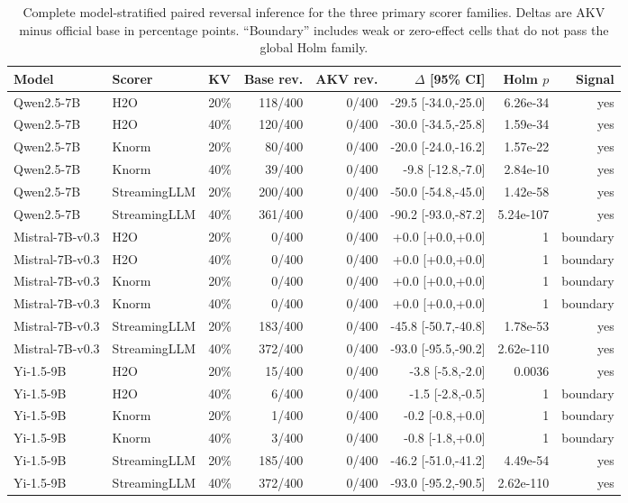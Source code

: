 \begin{table}[t]
\centering
\scriptsize
\setlength{\tabcolsep}{3.0pt}
\begin{tabular}{lllrrrrr}
\toprule
Model & Scorer & KV & Base rev. & AKV rev. & $\Delta$ [95\% CI] & Holm $p$ & Signal \\
\midrule
Qwen2.5-7B & H2O & 20\% & 118/400 & 0/400 & -29.5 [-34.0,-25.0] & 6.26e-34 & yes \\
Qwen2.5-7B & H2O & 40\% & 120/400 & 0/400 & -30.0 [-34.5,-25.8] & 1.59e-34 & yes \\
Qwen2.5-7B & Knorm & 20\% & 80/400 & 0/400 & -20.0 [-24.0,-16.2] & 1.57e-22 & yes \\
Qwen2.5-7B & Knorm & 40\% & 39/400 & 0/400 & -9.8 [-12.8,-7.0] & 2.84e-10 & yes \\
Qwen2.5-7B & StreamingLLM & 20\% & 200/400 & 0/400 & -50.0 [-54.8,-45.0] & 1.42e-58 & yes \\
Qwen2.5-7B & StreamingLLM & 40\% & 361/400 & 0/400 & -90.2 [-93.0,-87.2] & 5.24e-107 & yes \\
\midrule
Mistral-7B-v0.3 & H2O & 20\% & 0/400 & 0/400 & +0.0 [+0.0,+0.0] & 1 & boundary \\
Mistral-7B-v0.3 & H2O & 40\% & 0/400 & 0/400 & +0.0 [+0.0,+0.0] & 1 & boundary \\
Mistral-7B-v0.3 & Knorm & 20\% & 0/400 & 0/400 & +0.0 [+0.0,+0.0] & 1 & boundary \\
Mistral-7B-v0.3 & Knorm & 40\% & 0/400 & 0/400 & +0.0 [+0.0,+0.0] & 1 & boundary \\
Mistral-7B-v0.3 & StreamingLLM & 20\% & 183/400 & 0/400 & -45.8 [-50.7,-40.8] & 1.78e-53 & yes \\
Mistral-7B-v0.3 & StreamingLLM & 40\% & 372/400 & 0/400 & -93.0 [-95.5,-90.2] & 2.62e-110 & yes \\
\midrule
Yi-1.5-9B & H2O & 20\% & 15/400 & 0/400 & -3.8 [-5.8,-2.0] & 0.0036 & yes \\
Yi-1.5-9B & H2O & 40\% & 6/400 & 0/400 & -1.5 [-2.8,-0.5] & 1 & boundary \\
Yi-1.5-9B & Knorm & 20\% & 1/400 & 0/400 & -0.2 [-0.8,+0.0] & 1 & boundary \\
Yi-1.5-9B & Knorm & 40\% & 3/400 & 0/400 & -0.8 [-1.8,+0.0] & 1 & boundary \\
Yi-1.5-9B & StreamingLLM & 20\% & 185/400 & 0/400 & -46.2 [-51.0,-41.2] & 4.49e-54 & yes \\
Yi-1.5-9B & StreamingLLM & 40\% & 372/400 & 0/400 & -93.0 [-95.2,-90.5] & 2.62e-110 & yes \\
\bottomrule
\end{tabular}
\caption{Complete model-stratified paired reversal inference for the three primary scorer families. Deltas are AKV minus official base in percentage points. ``Boundary'' includes weak or zero-effect cells that do not pass the global Holm family.}
\label{tab:primary-paired-full}
\end{table}
